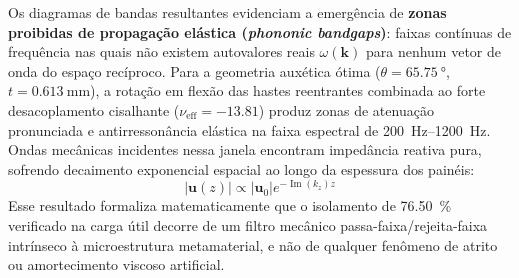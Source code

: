 Os diagramas de bandas resultantes evidenciam a emergência de \textbf{zonas proibidas de propagação elástica (\textit{phononic bandgaps})}: faixas contínuas de frequência nas quais não existem autovalores reais $\omega(\mathbf{k})$ para nenhum vetor de onda do espaço recíproco. Para a geometria auxética ótima ($\theta = \SI{65.75}{\degree}$, $t = \SI{0.613}{\milli\metre}$), a rotação em flexão das hastes reentrantes combinada ao forte desacoplamento cisalhante ($\nu_{\text{eff}} = \num{-13.81}$) produz zonas de atenuação pronunciada e antirressonância elástica na faixa espectral de \SIrange{200}{1200}{\hertz}. Ondas mecânicas incidentes nessa janela encontram impedância reativa pura, sofrendo decaimento exponencial espacial ao longo da espessura dos painéis:
\begin{equation}
  |\mathbf{u}(z)| \propto |\mathbf{u}_0| e^{-\operatorname{Im}(k_z) z}
  \label{eq:atenuacao-exp}
\end{equation}
Esse resultado formaliza matematicamente que o isolamento de \SI{76.50}{\percent} verificado na carga útil decorre de um filtro mecânico passa-faixa/rejeita-faixa intrínseco à microestrutura metamaterial, e não de qualquer fenômeno de atrito ou amortecimento viscoso artificial.

